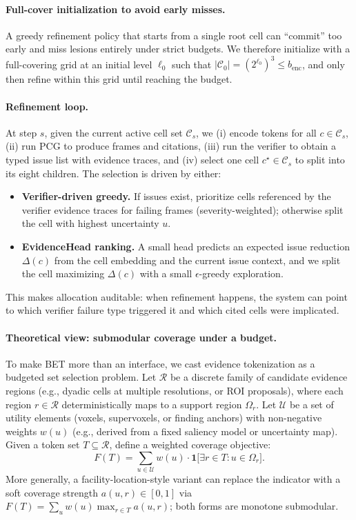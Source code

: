 \paragraph{Full-cover initialization to avoid early misses.}
A greedy refinement policy that starts from a single root cell can ``commit'' too early and miss lesions entirely under strict budgets.
We therefore initialize with a full-covering grid at an initial level $\ell_0$ such that $|{\mathcal C}_0|=(2^{\ell_0})^3 \le b_{\mathrm{enc}}$, and only then refine within this grid until reaching the budget.

\paragraph{Refinement loop.}
At step $s$, given the current active cell set ${\mathcal C}_s$, we (i) encode tokens for all $c\in{\mathcal C}_s$, (ii) run PCG to produce frames and citations, (iii) run the verifier to obtain a typed issue list with evidence traces, and (iv) select one cell $c^\star\in{\mathcal C}_s$ to split into its eight children.
The selection is driven by either:
\begin{itemize}
  \item \textbf{Verifier-driven greedy.} If issues exist, prioritize cells referenced by the verifier evidence traces for failing frames (severity-weighted); otherwise split the cell with highest uncertainty $u$.
  \item \textbf{EvidenceHead ranking.} A small head predicts an expected issue reduction $\Delta(c)$ from the cell embedding and the current issue context, and we split the cell maximizing $\Delta(c)$ with a small $\epsilon$-greedy exploration.
\end{itemize}
This makes allocation auditable: when refinement happens, the system can point to which verifier failure type triggered it and which cited cells were implicated.

\paragraph{Theoretical view: submodular coverage under a budget.}
To make BET more than an interface, we cast evidence tokenization as a budgeted set selection problem.
Let $\mathcal{R}$ be a discrete family of candidate evidence regions (e.g., dyadic cells at multiple resolutions, or ROI proposals), where each region $r\in\mathcal{R}$ deterministically maps to a support region $\Omega_r$.
Let $\mathcal{U}$ be a set of utility elements (voxels, supervoxels, or finding anchors) with non-negative weights $w(u)$ (e.g., derived from a fixed saliency model or uncertainty map).
Given a token set $T\subseteq \mathcal{R}$, define a weighted coverage objective:
\begin{equation}
  F(T)=\sum_{u\in \mathcal{U}} w(u)\cdot \mathbf{1}\big[\exists r\in T: u\in \Omega_r\big].
\end{equation}
More generally, a facility-location-style variant can replace the indicator with a soft coverage strength $a(u,r)\in[0,1]$ via $F(T)=\sum_u w(u)\max_{r\in T} a(u,r)$; both forms are monotone submodular.
